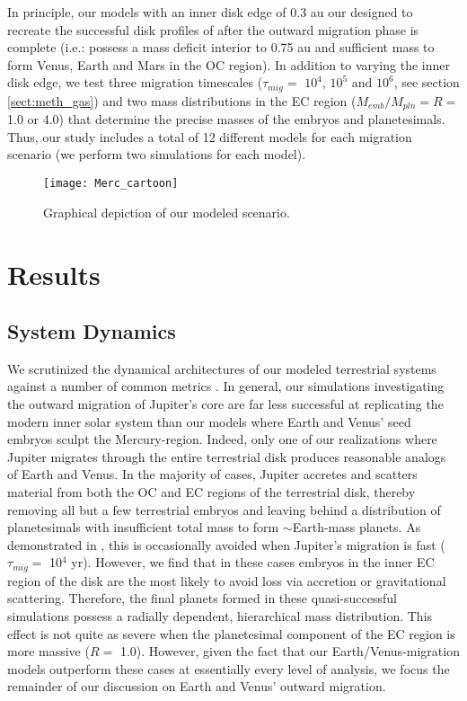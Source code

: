 \documentclass[trackchanges,twocolumn]{aastex}
\begin{document}
In principle, our models with an inner disk edge of 0.3 au our designed to recreate the successful disk profiles of \citep{clement21_merc2} after the outward migration phase is complete (i.e.: possess a mass deficit interior to 0.75 au and sufficient mass to form Venus, Earth and Mars in the OC region).  In addition to varying the inner disk edge, we test three migration timescales ($\tau_{mig}=$ $10^{4}$, $10^{5}$ and $10^{6}$, see section \ref{sect:meth_gas}) and two mass distributions in the EC region ($M_{emb}/M_{pln}=R=$ 1.0 or 4.0) that determine the precise masses of the embryos and planetesimals.  Thus, our study includes a total of 12 different models for each migration scenario (we perform two simulations for each model).  

\begin{figure*}
	\centering
	\texttt{[image: Merc\_cartoon]}
	\caption{Graphical depiction of our modeled scenario.}
	\label{fig:cartoon}
\end{figure*} 

\section{Results}
\label{sect:results}

\subsection{System Dynamics}
\label{sect:res_dyn}
We scrutinized the dynamical architectures of our modeled terrestrial systems against a number of common metrics \citep[e.g.:][]{chambers01}. In general, our simulations investigating the outward migration of Jupiter's core are far less successful at replicating the modern inner solar system than our models where Earth and Venus' seed embryos sculpt the Mercury-region.  Indeed, only one of our realizations where Jupiter migrates through the entire terrestrial disk produces reasonable analogs of Earth and Venus.  In the majority of cases, Jupiter accretes and scatters material from both the OC and EC regions of the terrestrial disk, thereby removing all but a few terrestrial embryos and leaving behind a distribution of planetesimals with insufficient total mass to form $\sim$Earth-mass planets.  As demonstrated in \citet{ray16}, this is occasionally avoided when Jupiter's migration is fast ($\tau_{mig}=$ 10$^{4}$ yr).  However, we find that in these cases embryos in the inner EC region of the disk are the most likely to avoid loss via accretion or gravitational scattering.  Therefore, the final planets formed in these quasi-successful simulations possess a radially dependent, hierarchical mass distribution.  This effect is not quite as severe when the planetesimal component of the EC region is more massive ($R=$ 1.0).  However, given the fact that our Earth/Venus-migration models outperform these cases at essentially every level of analysis, we focus the remainder of our discussion on Earth and Venus' outward migration.
\end{document}
